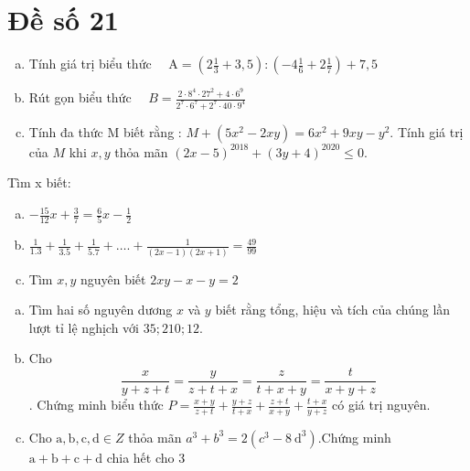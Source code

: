 \onehalfspacing
\section{Đề số 21}

\begin{bt} 
    \hfill
    \begin{enumerate}[a.]
        \item Tính giá trị biểu thức $\quad \mathrm{A}=\left(2 \frac{1}{3}+3,5\right):\left(-4 \frac{1}{6}+2 \frac{1}{7}\right)+7,5$
        \item Rút gọn biểu thức $\quad B=\frac{2 \cdot 8^4 \cdot 27^2+4 \cdot 6^9}{2^7 \cdot 6^7+2^7 \cdot 40 \cdot 9^4}$
        \item Tính đa thức $\mathrm{M}$ biết rằng : $M+\left(5 x^2-2 x y\right)=6 x^2+9 x y-y^2$. Tính giá trị của $M$ khi $x, y$ thỏa mãn $(2 x-5)^{2018}+(3 y+4)^{2020} \leq 0$.
    \end{enumerate}
\loigiai{}
\end{bt}

\begin{bt}
    Tìm x biết: 
	\begin{enumerate}[a.]
        \item $-\frac{15}{12} x+\frac{3}{7}=\frac{6}{5} x-\frac{1}{2}$
        \item $\frac{1}{1.3}+\frac{1}{3.5}+\frac{1}{5.7}+\ldots .+\frac{1}{(2 x-1)(2 x+1)}=\frac{49}{99}$
        \item Tìm $x, y$ nguyên biết $2 x y-x-y=2$
    \end{enumerate}
	\loigiai{} 
\end{bt}

\begin{bt}
    \hfill
	\begin{enumerate}[a.]
        \item Tìm hai số nguyên dương $x$ và $y$ biết rằng tổng, hiệu và tích của chúng lần lượt tỉ lệ nghịch với $35 ; 210 ; 12$.
        \item Cho $$\frac{x}{y+z+t}=\frac{y}{z+t+x}=\frac{z}{t+x+y}=\frac{t}{x+y+z}$$. Chứng minh biểu thức $P=\frac{x+y}{z+t}+\frac{y+z}{t+x}+\frac{z+t}{x+y}+\frac{t+x}{y+z}$ có giá trị nguyên.
        \item Cho $\mathrm{a}, \mathrm{b}, \mathrm{c}, \mathrm{d} \in Z$ thỏa mãn $a^3+b^3=2\left(c^3-8 \mathrm{~d}^3\right)$.Chứng minh $\mathrm{a}+\mathrm{b}+\mathrm{c}+\mathrm{d}$ chia hết cho 3
    \end{enumerate}
	\loigiai{}
\end{bt}

